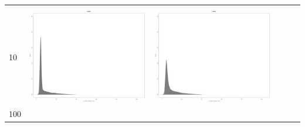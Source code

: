 \begin{table}[htbp]
{\begin{tabular}{l | ccccc}
\begin{minipage}{.1\textwidth}
    				 \end{minipage}\\			
		10	   & \begin{minipage}{.1\textwidth}
     			 	\includegraphics[width=\linewidth]{images/mema-dens-graph/N2}
    				\end{minipage}
    			   & \begin{minipage}{.1\textwidth}
     			 	\includegraphics[width=\linewidth]{images/mema-dens-graph/N6}
    				 \end{minipage}\\		
		100	   & \begin{minipage}{.1\textwidth}

\end{minipage}
\end{tabular}}
\end{table}
